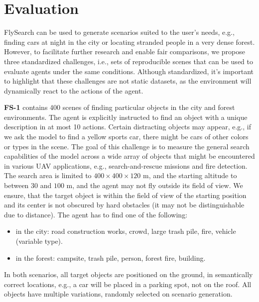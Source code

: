 \documentclass{article}
\theoremstyle{plain}
\theoremstyle{definition}
\theoremstyle{remark}
\newcommand{\ours}{FlySearch}
\newcommand{\challenge}{FS-1}
\begin{document}
\section{Evaluation}
\label{sec:evaluation}


\ours{} can be used to generate scenarios suited to the user's needs, e.g., finding cars at night in the city or locating stranded people in a very dense forest. However, to facilitate further research and enable fair comparisons, we propose three standardized challenges, i.e., sets of reproducible scenes that can be used to evaluate agents under the same conditions. Although standardized, it's important to highlight that these challenges are not static datasets, as the environment will dynamically react to the actions of the agent.


\textbf{\challenge{}} contains 400 scenes of finding particular objects in the city and forest environments. The agent is explicitly instructed to find an object with a unique description in at most 10 actions. Certain distracting objects may appear, e.g., if we ask the model to find a yellow sports car, there might be cars of other colors or types in the scene. The goal of this challenge is to measure the general search capabilities of the model across a wide array of objects that might be encountered in various UAV applications, e.g., search-and-rescue missions and fire detection. The search area is limited to $400\times400\times120$ m, and the starting altitude to between $30$ and $100$ m, and the agent may not fly outside its field of view. We ensure, that the target object is within the field of view of the starting position and its center is not obscured by hard obstacles (it may not be distinguishable due to distance). 
The agent has to find one of the following: 
\begin{itemize}[noitemsep,topsep=0pt]
    \item in the city: road construction works, crowd, large trash pile, fire, vehicle (variable type).
    \item in the forest: campsite, trash pile, person, forest fire, building.
\end{itemize}
In both scenarios, all target objects are positioned on the ground, in semantically correct locations, e.g., a car will be placed in a parking spot, not on the roof. All objects have multiple variations, randomly selected on scenario generation.


\end{document}
